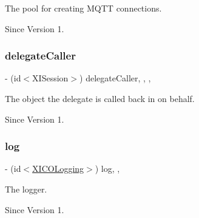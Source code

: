 The pool for creating M\+Q\+TT connections. 

\begin{DoxySince}{Since}
Version 1. 
\end{DoxySince}
\hypertarget{interface_x_i_session_internal_a8972d65fd7b30480733460a154556c4c}{}\label{interface_x_i_session_internal_a8972d65fd7b30480733460a154556c4c} 
\subsubsection{\texorpdfstring{delegate\+Caller}{delegateCaller}}
{\footnotesize\ttfamily -\/ (id$<$X\+I\+Session$>$) delegate\+Caller\hspace{0.3cm}{\ttfamily [read]}, {\ttfamily [write]}, {\ttfamily [nonatomic]}, {\ttfamily [weak]}}



The object the delegate is called back in on behalf. 

\begin{DoxySince}{Since}
Version 1. 
\end{DoxySince}
\hypertarget{interface_x_i_session_internal_a952ede1c227c8e4b04db8daf7fbe1193}{}\label{interface_x_i_session_internal_a952ede1c227c8e4b04db8daf7fbe1193} 
\subsubsection{\texorpdfstring{log}{log}}
{\footnotesize\ttfamily -\/ (id$<$\hyperlink{protocol_x_i_c_o_logging-p}{X\+I\+C\+O\+Logging}$>$) log\hspace{0.3cm}{\ttfamily [read]}, {\ttfamily [atomic]}, {\ttfamily [assign]}}



The logger. 

\begin{DoxySince}{Since}
Version 1. 
\end{DoxySince}
\hypertarget{interface_x_i_session_internal_a523cb81fba56a180f39be09c7d5e49b1}{}\label{interface_x_i_session_internal_a523cb81fba56a180f39be09c7d5e49b1} 
